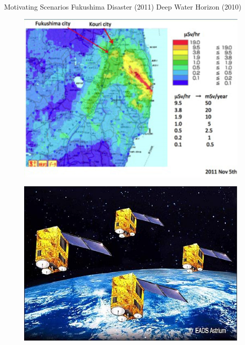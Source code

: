 \begin{frame}{Motivating Scenarios}
    Fukushima Disaster (2011)
    \hspace{0.4 cm}
    Deep Water Horizon (2010)
    \\
	\begin{minipage}{0.45\textwidth}	
		\begin{figure}
			\includegraphics[width=1\textwidth]{figures/fukushima_disaster.jpg}
		\end{figure}
		\begin{figure}
			\includegraphics[scale=0.2]{figures/Essaim_constellation.jpg}\label{fig:satellite_flock}

\end{figure}
\end{minipage}
\end{frame}
